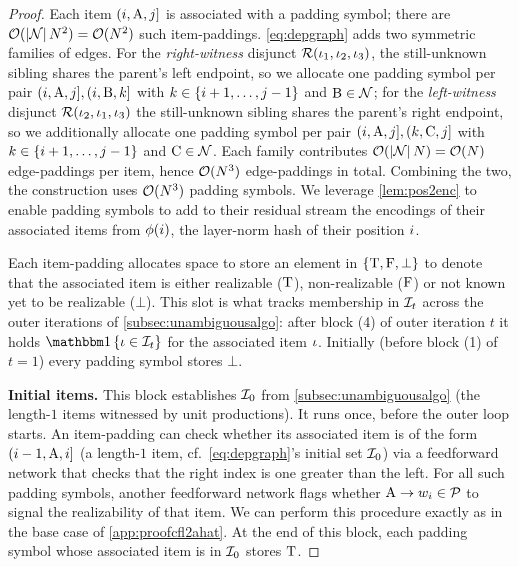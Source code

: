 \documentclass{article}
\begin{document}
\begin{proof}
    Each item $({{ i}}, {{ \mathrm{A}}}, {{ j}}]$ is associated with a padding symbol; there are ${{ \mathcal{O}}}(|{{ \mathcal{N}}}|\,{{ N}}^2) = {{ \mathcal{O}}}({{ N}}^2)$ such item-paddings. \cref{eq:depgraph} adds two symmetric families of edges. For the \emph{right-witness} disjunct ${{{ \mathcal{R}}}}({{ \iota}}_1, {{ \iota}}_2, {{ \iota}}_3)$, the still-unknown sibling shares the parent's left endpoint, so we allocate one padding symbol per pair $({{ i}}, {{ \mathrm{A}}}, {{ j}}], ({{ i}}, {{ \mathrm{B}}}, {{ k}}]$ with ${{ k}} \in {{\{ {{ i}}+1, \ldots, {{ j}}-1 \}}}$ and ${{ \mathrm{B}}} \in {{ \mathcal{N}}}$; for the \emph{left-witness} disjunct ${{{ \mathcal{R}}}}({{ \iota}}_2, {{ \iota}}_1, {{ \iota}}_3)$ the still-unknown sibling shares the parent's right endpoint, so we additionally allocate one padding symbol per pair $({{ i}}, {{ \mathrm{A}}}, {{ j}}], ({{ k}}, {{ \mathrm{C}}}, {{ j}}]$ with ${{ k}} \in {{\{ {{ i}}+1, \ldots, {{ j}}-1 \}}}$ and ${{ \mathrm{C}}} \in {{ \mathcal{N}}}$. Each family contributes ${{ \mathcal{O}}}(|{{ \mathcal{N}}}|\,{{ N}}) = {{ \mathcal{O}}}({{ N}})$ edge-paddings per item, hence ${{ \mathcal{O}}}({{ N}}^3)$ edge-paddings in total. Combining the two, the construction uses ${{ \mathcal{O}}}({{ N}}^3)$ padding symbols.
    We leverage \cref{lem:pos2enc} to enable padding symbols to add to their residual stream the encodings of their associated items from $\phi({{ i}})$, the layer-norm hash of their position ${{ i}}$.
    
    Each item-padding allocates space to store an element in ${{\{ {\mathbin{\mathrm{T}}},{\mathbin{\mathrm{F}}},\bot \}}}$ to denote that the associated item is either realizable (${\mathbin{\mathrm{T}}}$), non-realizable (${\mathbin{\mathrm{F}}}$) or not known yet to be realizable ($\bot$). 
    This slot is what tracks membership in ${{\mathcal{I}}}_t$ across the outer iterations of \cref{subsec:unambiguousalgo}: after block (4) of outer iteration $t$ it holds $\ind{\itm \in \items_t}$ for the associated item ${{ \iota}}$. Initially (before block (1) of $t=1$) every padding symbol stores $\bot$.
    
    \textbf{Initial items.}
    This block establishes ${{\mathcal{I}}}_0$ from \cref{subsec:unambiguousalgo} (the length-$1$ items witnessed by unit productions). It runs once, before the outer loop starts.
    An item-padding can check whether its associated item is of the form $({{ i}}-1,{{ \mathrm{A}}},{{ i}}]$ (a length-$1$ item, cf.\ \cref{eq:depgraph}'s initial set ${{\mathcal{I}}}_0$) via a feedforward network that checks that the right index is one greater than the left.
    For all such padding symbols, another feedforward network flags whether ${{ {{ \mathrm{A}}} \rightarrow {w}_{{ i}}}} \in {{ \mathcal{P}}}$ to signal the realizability of that item.
    We can perform this procedure exactly as in the base case of \cref{app:proofcfl2ahat}.
    At the end of this block, each padding symbol whose associated item is in ${{\mathcal{I}}}_0$ stores ${\mathbin{\mathrm{T}}}$.
    

\end{proof}
\end{document}
